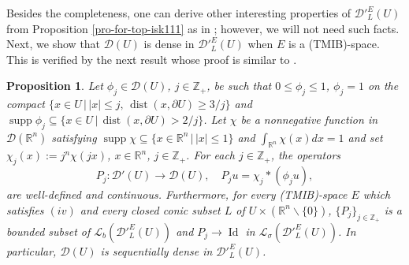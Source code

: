 \documentclass[12pt,reqno]{amsart}
\newcommand{\RR}{\mathbb R}
\newcommand{\ZZ}{\mathbb Z}
\newcommand{\DD}{\mathcal D}
\newcommand{\supp}{\operatorname{supp}}
\theoremstyle{plain}
\newtheorem{proposition}[theorem]{Proposition}
\theoremstyle{remark}
\theoremstyle{definition}
\numberwithin{equation}{section}
\begin{document}
Besides the completeness, one can derive other interesting properties of $\DD'^E_L(U)$ from Proposition \ref{pro-for-top-isk111} as in \cite{PP}; however, we will not need such facts.\\
\indent Next, we show that $\DD(U)$ is dense in $\DD'^E_L(U)$ when $E$ is a (TMIB)-space. This is verified by the next result whose proof is similar to \cite[Proposition 3.13]{PP}.

\begin{proposition}\label{seq-den-comsmf}
Let $\phi_j\in\DD(U)$, $j\in\ZZ_+$, be such that $0\leq \phi_j\leq 1$, $\phi_j=1$ on the compact $\{x\in U\,|\, |x|\leq j,\, \operatorname{dist}(x,\partial U)\geq 3/j\}$ and $\supp\phi_j\subseteq \{x\in U\,|\, \operatorname{dist}(x,\partial U)> 2/j\}$. Let $\chi$ be a nonnegative function in $\DD(\RR^n)$ satisfying $\supp\chi\subseteq \{x\in\RR^n\,|\, |x|\leq 1\}$ and $\int_{\RR^n} \chi(x) dx=1$ and set $\chi_j(x):=j^n\chi(jx)$, $x\in\RR^n$, $j\in\ZZ_+$. For each $j\in\ZZ_+$, the operators
\begin{equation}\label{ope-app-ide-simc}
P_j:\DD'(U)\rightarrow\DD(U),\quad P_ju=\chi_j*(\phi_j u),
\end{equation}
are well-defined and continuous. Furthermore, for every (TMIB)-space $E$ which satisfies $(iv)$ and every closed conic subset $L$ of $U\times (\RR^n\backslash\{0\})$, $\{P_j\}_{j\in\ZZ_+}$ is a bounded subset of $\mathcal{L}_b(\DD'^E_L(U))$ and $P_j\rightarrow \operatorname{Id}$ in $\mathcal{L}_{\sigma}(\DD'^E_L(U))$. In particular, $\DD(U)$ is sequentially dense in $\DD'^E_L(U)$.
\end{proposition}
\end{document}
